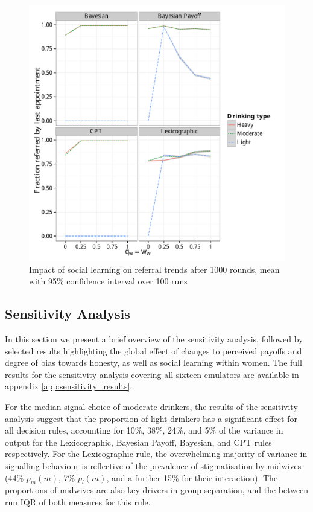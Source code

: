 \begin{figure}[H]
\begin{adjustbox}{center}
\includegraphics[width=119mm]{figures/ref_sharing}
\end{adjustbox}
\caption{Impact of social learning on referral trends after 1000 rounds, mean with 95\% confidence interval over 100 runs}
\label{fig:ref_sharing}
\end{figure}


\subsection{Sensitivity Analysis}
\label{sub:sa_results}

In this section we present a brief overview of the sensitivity analysis, followed by selected results highlighting the global effect of changes to perceived payoffs and degree of bias towards honesty, as well as social learning within women. The full results for the sensitivity analysis covering all sixteen emulators are available in appendix \ref{app:sensitivity_results}.

For the median signal choice of moderate drinkers, the results of the sensitivity analysis suggest that the proportion of light drinkers has a significant effect for all decision rules, accounting for 10\%, 38\%, 24\%, and 5\% of the variance in output for the Lexicographic, Bayesian Payoff, Bayesian, and \ac{CPT} rules respectively. For the Lexicographic rule, the overwhelming majority of variance in signalling behaviour is reflective of the prevalence of stigmatisation by midwives (44\% \(p_{m}(m)\), 7\% \(p_{l}(m)\), and a further 15\% for their interaction).  The proportions of midwives are also key drivers in group separation, and the between run IQR of both measures for this rule. 

